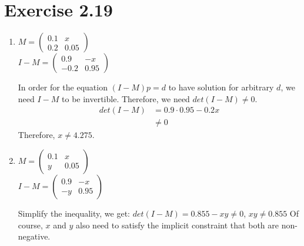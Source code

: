 \documentclass{article}
\begin{document}
\section*{Exercise 2.19}

\begin{enumerate}[label=(\alph*)]
\item $M =
\begin{pmatrix}
  0.1 & x \\
  0.2 & 0.05
\end{pmatrix}
$\\
$I-M =
\begin{pmatrix}
  0.9 & -x \\
  -0.2 & 0.95
\end{pmatrix}
$

In order for the equation $(I-M)p = d$ to have solution for arbitrary
$d$, we need $I-M$ to be invertible. Therefore, we need $det(I-M) \neq
0$.
\begin{equation*}
  \begin{split}
    det(I-M)
    &= 0.9 \cdot 0.95 - 0.2x \\
    &\neq 0
  \end{split}
\end{equation*}
Therefore, $x \neq 4.275$.
\item $M =
\begin{pmatrix}
  0.1 & x \\
  y & 0.05
\end{pmatrix}
$\\
$I-M =
\begin{pmatrix}
  0.9 & -x \\
  -y & 0.95
\end{pmatrix}
$

Simplify the inequality, we get:
$det(I-M)= 0.855 - xy \neq 0$, $xy \neq 0.855$
Of course, $x$ and $y$ also need to satisfy the implicit constraint
that both are non-negative.
\end{enumerate}
\end{document}
